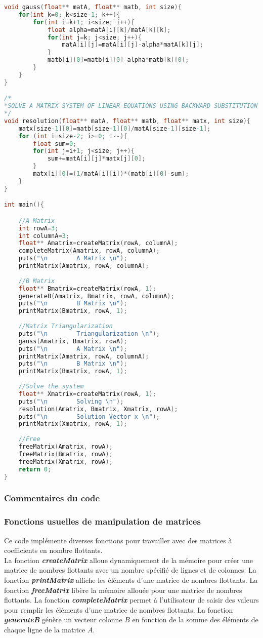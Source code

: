 \documentclass{report}
\begin{document}
\begin{lstlisting}[language=C,inputencoding=utf8]
void gauss(float** matA, float** matb, int size){
	for(int k=0; k<size-1; k++){
		for(int i=k+1; i<size; i++){
			float alpha=matA[i][k]/matA[k][k];
			for(int j=k; j<size; j++){
				matA[i][j]=matA[i][j]-alpha*matA[k][j];
			}
			matb[i][0]=matb[i][0]-alpha*matb[k][0];
		}
	}
}

/*
*SOLVE A MATRIX SYSTEM OF LINEAR EQUATIONS USING BACKWARD SUBSTITUTION
*/
void resolution(float** matA, float** matb, float** matx, int size){
	matx[size-1][0]=matb[size-1][0]/matA[size-1][size-1];
	for (int i=size-2; i>=0; i--){
		float sum=0;
		for(int j=i+1; j<size; j++){
			sum+=matA[i][j]*matx[j][0];
		}
		matx[i][0]=(1/matA[i][i])*(matb[i][0]-sum);
	}
}

int main(){

	//A Matrix
	int rowA=3;
	int columnA=3;
	float** Amatrix=createMatrix(rowA, columnA);
	completeMatrix(Amatrix, rowA, columnA);
	puts("\n		A Matrix \n");
	printMatrix(Amatrix, rowA, columnA);
	
	//B Matrix
	float** Bmatrix=createMatrix(rowA, 1);
	generateB(Amatrix, Bmatrix, rowA, columnA);
	puts("\n		B Matrix \n");
	printMatrix(Bmatrix, rowA, 1);
	
	//Matrix Triangularization
	puts("\n		Triangularization \n");
	gauss(Amatrix, Bmatrix, rowA);
	puts("\n		A Matrix \n");
	printMatrix(Amatrix, rowA, columnA);
	puts("\n		B Matrix \n");
	printMatrix(Bmatrix, rowA, 1);
	
	//Solve the system
	float** Xmatrix=createMatrix(rowA, 1);
	puts("\n		Solving \n");
	resolution(Amatrix, Bmatrix, Xmatrix, rowA);
	puts("\n		Solution Vector x \n");
	printMatrix(Xmatrix, rowA, 1);
	
	//Free
	freeMatrix(Amatrix, rowA);
	freeMatrix(Bmatrix, rowA);
	freeMatrix(Xmatrix, rowA);
	return 0;
}
\end{lstlisting}

\subsubsection{Commentaires du code}
\subsubsection{Fonctions usuelles de manipulation de matrices}\label{fonctusu}
Ce code implémente diverses fonctions pour travailler avec des matrices à coefficients en nombre flottants.\\

La fonction \textit{\textbf{createMatrix}} alloue dynamiquement de la mémoire pour créer une matrice de nombres flottants avec un nombre spécifié de lignes et de colonnes.
La fonction \textit{\textbf{printMatrix}} affiche les éléments d'une matrice de nombres flottants.
La fonction \textit{\textbf{freeMatrix}} libère la mémoire allouée pour une matrice de nombres flottants.
La fonction \textit{\textbf{completeMatrix}} permet à l'utilisateur de saisir des valeurs pour remplir les éléments d'une matrice de nombres flottants.
La fonction \textit{\textbf{generateB}} génère un vecteur colonne $B$ en fonction de la somme des éléments de chaque ligne de la matrice $A$.
\end{document}
